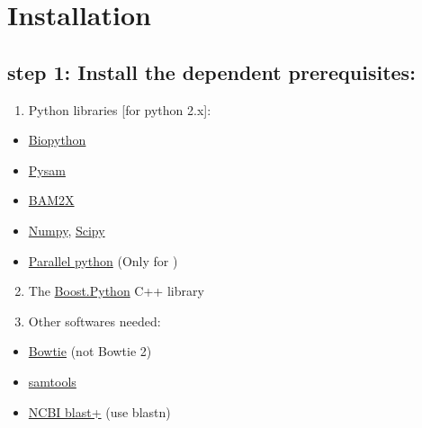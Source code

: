 \documentclass[letterpaper,10pt,english]{sphinxmanual}
\begin{document}
\section{Installation}
\label{RNA-Hi-C-tools:installation}

\subsection{step 1: Install the dependent prerequisites:}
\label{RNA-Hi-C-tools:step-1-install-the-dependent-prerequisites}\begin{enumerate}
\item {} 
Python libraries {[}for python 2.x{]}:

\end{enumerate}
\begin{itemize}
\item {} 
\href{http://biopython.org/wiki/Main\_Page}{Biopython}

\item {} 
\href{https://code.google.com/p/pysam/}{Pysam}

\item {} 
\href{http://bam2xwiki.appspot.com/Welcome}{BAM2X}

\item {} 
\href{http://www.numpy.org/}{Numpy}, \href{http://www.scipy.org/scipylib/index.html}{Scipy}

\item {} 
\href{http://www.parallelpython.com/}{Parallel python} (Only for )

\end{itemize}
\begin{enumerate}
\setcounter{enumi}{1}
\item {} 
The \href{http://www.boost.org/doc/libs/1\_54\_0/libs/python/doc/index.html}{Boost.Python} C++ library

\item {} 
Other softwares needed:

\end{enumerate}
\begin{itemize}
\item {} 
\href{http://bowtie-bio.sourceforge.net/index.shtml}{Bowtie} (not Bowtie 2)

\item {} 
\href{http://samtools.sourceforge.net/}{samtools}

\item {} 
\href{ftp://ftp.ncbi.nlm.nih.gov/blast/executables/blast+/LATEST/}{NCBI blast+} (use blastn)

\end{itemize}
\end{document}
